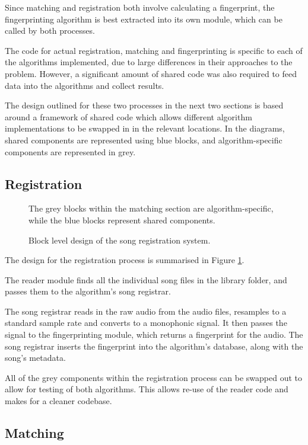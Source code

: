 \documentclass[12pt,a4paper,twoside,openright]{report}
\begin{document}
Since matching and registration both involve calculating a fingerprint, the fingerprinting algorithm is best extracted into its own module, which can be called by both processes.

The code for actual registration, matching and fingerprinting is specific to each of the algorithms implemented, due to large differences in their approaches to the problem. However, a significant amount of shared code was also required to feed data into the algorithms and collect results.

The design outlined for these two processes in the next two sections is based around a framework of shared code which allows different algorithm implementations to be swapped in in the relevant locations. In the diagrams, shared components are represented using blue blocks, and algorithm-specific components are represented in grey. 


\subsection{Registration}

\begin{figure}[htb]
  \centering
  
  \caption{Block level design of the song registration system.}
  \label{figs:registration_design}
  \medskip \small
  The grey blocks within the matching section are algorithm-specific, while the blue blocks represent shared components.
\end{figure}

The design for the registration process is summarised in Figure \ref{figs:registration_design}. 

The reader module finds all the individual song files in the library folder, and passes them to the algorithm's song registrar.

The song registrar reads in the raw audio from the audio files, resamples to a standard sample rate and converts to a monophonic signal. It then passes the signal to the fingerprinting module, which returns a fingerprint for the audio. The song registrar inserts the fingerprint into the algorithm's database, along with the song's metadata.

All of the grey components within the registration process can be swapped out to allow for testing of both algorithms. This allows re-use of the reader code and makes for a cleaner codebase.


\subsection{Matching}
\end{document}
